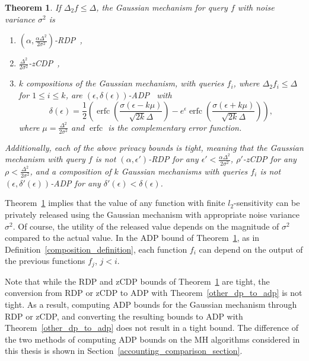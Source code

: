 \documentclass[english,twoside,openright]{HYgraduMLDS}
\newtheorem{theorem}[lemma]{Theorem}
\DeclareMathOperator{\erfc}{erfc}
\begin{document}
\begin{theorem}\label{gauss-DP-bounds}
  If \(\Delta_{2}f \leq \Delta\), the Gaussian mechanism for query \(f\) with
  noise variance \(\sigma^{2}\) is
    \begin{enumerate}
        \item 
            \((\alpha, \frac{\alpha \Delta^2}{2\sigma^2})\)-RDP~\cite{Mironov17},
        \item 
            \(\frac{\Delta^2}{2\sigma^2}\)-zCDP~\cite{BuS16},
        \item 
            \(k\) compositions of the Gaussian mechanism, with
            queries \(f_{i}\), where \(\Delta_{2}f_{i}\leq \Delta\) for
            \(1\leq i \leq k\), are
            \((\epsilon, \delta(\epsilon))\)-ADP~\cite{Sommer2019} with 
            \[
                \delta(\epsilon) 
                = \frac{1}{2}\left(
                    \erfc\left(\frac{\sigma(\epsilon - k\mu)}{\sqrt{2k}\Delta}\right)
                    - e^\epsilon \erfc\left(\frac{\sigma(\epsilon + k\mu)}{\sqrt{2k}\Delta}\right)
                \right),
            \]
            where \(\mu = \frac{\Delta^2}{2\sigma^2}\) and \(\erfc\) is 
            the complementary error function.
    \end{enumerate}
    Additionally, each of the above privacy bounds is tight, meaning that
    the Gaussian mechanism with query \(f\) is not \((\alpha, \epsilon')\)-RDP
    for any \(\epsilon' < \frac{\alpha\Delta^{2}}{2\sigma^{2}}\), \(\rho'\)-zCDP
    for any \(\rho < \frac{\Delta^{2}}{2\sigma^{2}}\), and a composition
    of \(k\) Gaussian mechanisms with queries \(f_{i}\) is not
    \((\epsilon, \delta'(\epsilon))\)-ADP for any
    \(\delta'(\epsilon) < \delta(\epsilon)\).
\end{theorem}

Theorem~\ref{gauss-DP-bounds} implies that the value of any function with
finite \(l_2\)-sensitivity can be privately released using the Gaussian mechanism
with appropriate noise variance \(\sigma^2\). Of course, the utility of the
released value depends on the magnitude of \(\sigma^2\) compared to the actual
value. In the ADP bound of Theorem~\ref{gauss-DP-bounds},
as in Definition~\ref{composition_definition}, each function \(f_{i}\)
can depend on the output of the previous functions \(f_{j}\), \(j < i\).

Note that while the RDP and zCDP bounds of Theorem~\ref{gauss-DP-bounds} are
tight, the conversion from RDP or zCDP to ADP with Theorem~\ref{other_dp_to_adp}
is not tight. As a result, computing
ADP bounds for the Gaussian mechanism through RDP or zCDP, and converting
the resulting bounds to ADP with Theorem~\ref{other_dp_to_adp} does not
result in a tight bound. The difference of the two methods of computing ADP bounds
on the MH algorithms considered in this thesis is shown in
Section~\ref{accounting_comparison_section}.
\end{document}
